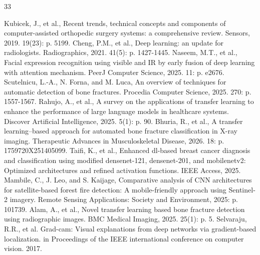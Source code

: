 \documentclass[conference]{IEEEtran}
\begin{document}
\begin{thebibliography}{33}

Kubicek, J., et al., Recent trends, technical concepts and components of computer-assisted orthopedic surgery systems: a comprehensive review. Sensors, 2019. 19(23): p. 5199.
Cheng, P.M., et al., Deep learning: an update for radiologists. Radiographics, 2021. 41(5): p. 1427-1445.
Naseem, M.T., et al., Facial expression recognition using visible and IR by early fusion of deep learning with attention mechanism. PeerJ Computer Science, 2025. 11: p. e2676.
Scutelnicu, L.-A., N. Forna, and M. Luca, An overview of techniques for automatic detection of bone fractures. Procedia Computer Science, 2025. 270: p. 1557-1567.
Rahujo, A., et al., A survey on the applications of transfer learning to enhance the performance of large language models in healthcare systems. Discover Artificial Intelligence, 2025. 5(1): p. 90.
Bhuria, R., et al., A transfer learning–based approach for automated bone fracture classification in X-ray imaging. Therapeutic Advances in Musculoskeletal Disease, 2026. 18: p. 1759720X251405099.
Taifi, K., et al., Enhanced dl-based breast cancer diagnosis and classification using modified densenet-121, densenet-201, and mobilenetv2: Optimized architectures and refined activation functions. IEEE Access, 2025.
Mambile, C., J. Leo, and S. Kaijage, Comparative analysis of CNN architectures for satellite-based forest fire detection: A mobile-friendly approach using Sentinel-2 imagery. Remote Sensing Applications: Society and Environment, 2025: p. 101739.
Alam, A., et al., Novel transfer learning based bone fracture detection using radiographic images. BMC Medical Imaging, 2025. 25(1): p. 5.
Selvaraju, R.R., et al. Grad-cam: Visual explanations from deep networks via gradient-based localization. in Proceedings of the IEEE international conference on computer vision. 2017.


\end{thebibliography}
\end{document}
